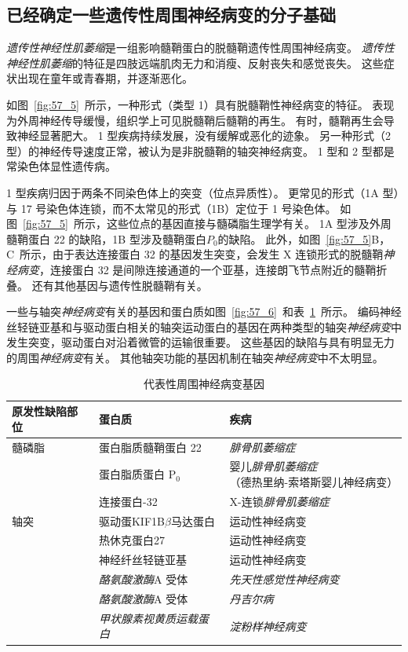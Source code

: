 \subsection{已经确定一些遗传性周围神经病变的分子基础}

\textit{遗传性神经性肌萎缩}是一组影响髓鞘蛋白的脱髓鞘遗传性周围神经病变。
\textit{遗传性神经性肌萎缩}的特征是四肢远端肌肉无力和消瘦、反射丧失和感觉丧失。
这些症状出现在童年或青春期，并逐渐恶化。


如图~\ref{fig:57_5}~所示，一种形式（类型 1）具有脱髓鞘性神经病变的特征。
表现为外周神经传导缓慢，组织学上可见脱髓鞘后髓鞘的再生。
有时，髓鞘再生会导致神经显著肥大。
1 型疾病持续发展，没有缓解或恶化的迹象。
另一种形式（2 型）的神经传导速度正常，被认为是非脱髓鞘的轴突神经病变。
1 型和 2 型都是常染色体显性遗传病。


1 型疾病归因于两条不同染色体上的突变（位点异质性）。
更常见的形式（1A 型）与 17 号染色体连锁，而不太常见的形式（1B）定位于 1 号染色体。
如图~\ref{fig:57_5}~所示，这些位点的基因直接与髓磷脂生理学有关。
1A 型涉及外周髓鞘蛋白 22 的缺陷，1B 型涉及髓鞘蛋白$P_0$的缺陷。
此外，如图~\ref{fig:57_5}B，C~所示，由于表达连接蛋白 32 的基因发生突变，会发生 X 连锁形式的脱髓鞘\textit{神经病变}，连接蛋白 32 是间隙连接通道的一个亚基，连接朗飞节点附近的髓鞘折叠。
还有其他基因与遗传性脱髓鞘有关。


一些与轴突\textit{神经病变}有关的基因和蛋白质如图~\ref{fig:57_6}~和表~\ref{tab:57_3}~所示。
编码神经丝轻链亚基和与驱动蛋白相关的轴突运动蛋白的基因在两种类型的轴突\textit{神经病变}中发生突变，驱动蛋白对沿着微管的运输很重要。
这些基因的缺陷与具有明显无力的周围\textit{神经病变}有关。
其他轴突功能的基因机制在轴突\textit{神经病变}中不太明显。



\begin{table}[htbp]
	\caption{代表性周围神经病变基因} \label{tab:57_3} \centering
	\begin{tabular}{lll}
		\toprule
		原发性缺陷部位 & 蛋白质 & 疾病 \\
		\midrule
		髓磷脂 & 蛋白脂质髓鞘蛋白 22 & \textit{腓骨肌萎缩症} \\
		\midrule
		 & 蛋白脂质蛋白 P$_0$ & \makecell{婴儿\textit{腓骨肌萎缩症}\\（德热里纳-索塔斯婴儿神经病变）} \\
		 & 连接蛋白-32 & X-连锁\textit{腓骨肌萎缩症} \\
		轴突 & 驱动蛋KIF1B$\beta$马达蛋白 & 运动性神经病变 \\
		 & 热休克蛋白27 & 运动性神经病变 \\
		 & 神经纤丝轻链亚基 & 运动性神经病变 \\
		 & \textit{酪氨酸激酶}A 受体 & \textit{先天性感觉性神经病变} \\
		 & \textit{酪氨酸激酶}A 受体 & \textit{丹吉尔病} \\
		 & \textit{甲状腺素视黄质运载蛋白} & \textit{淀粉样神经病变} \\
		\bottomrule
	\end{tabular}
\end{table}


